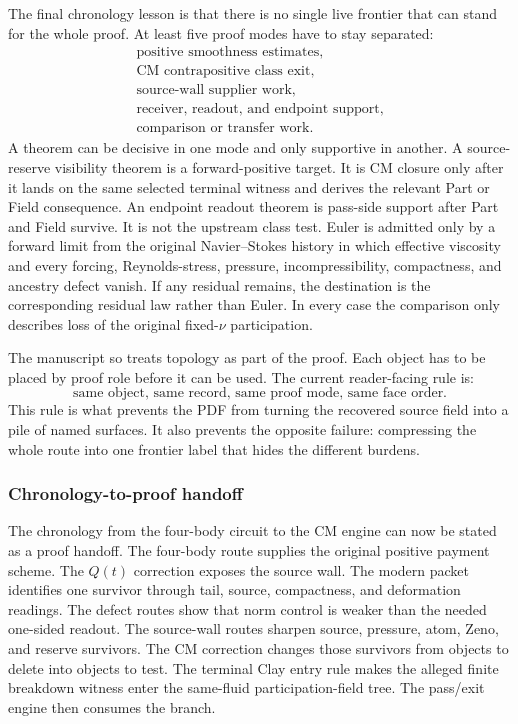 The final chronology lesson is that there is no single live frontier that can
stand for the whole proof.
At least five proof modes have to stay separated:
\[
  \begin{gathered}
  \text{positive smoothness estimates},\\
  \text{CM contrapositive class exit},\\
  \text{source-wall supplier work},\\
  \text{receiver, readout, and endpoint support},\\
  \text{comparison or transfer work.}
  \end{gathered}
\]
A theorem can be decisive in one mode and only supportive in another.
A source-reserve visibility theorem is a forward-positive target.
It is CM closure only after it lands on the same selected terminal witness and
derives the relevant Part or Field consequence.
An endpoint readout theorem is pass-side support after Part and Field
survive.
It is not the upstream class test.
Euler is admitted only by a forward limit from the original Navier--Stokes
history in which effective viscosity and every forcing, Reynolds-stress,
pressure, incompressibility, compactness, and ancestry defect vanish.  If any
residual remains, the destination is the corresponding residual law rather
than Euler.  In every case the comparison only describes loss of the original
fixed-\(\nu\) participation.

The manuscript so treats topology as part of the proof.
Each object has to be placed by proof role before it can be used.
The current reader-facing rule is:
\[
  \text{same object, same record, same proof mode, same face order.}
\]
This rule is what prevents the PDF from turning the recovered source field into
a pile of named surfaces.
It also prevents the opposite failure: compressing the whole route into one
frontier label that hides the different burdens.

\subsubsection{Chronology-to-proof handoff}

The chronology from the four-body circuit to the CM engine can now be stated as
a proof handoff.
The four-body route supplies the original positive payment scheme.
The \(Q(t)\) correction exposes the source wall.
The modern packet identifies one survivor through tail, source, compactness,
and deformation readings.
The defect routes show that norm control is weaker than the needed one-sided
readout.
The source-wall routes sharpen source, pressure, atom, Zeno, and reserve
survivors.
The CM correction changes those survivors from objects to delete into objects
to test.
The terminal Clay entry rule makes the alleged finite breakdown witness enter
the same-fluid participation-field tree.
The pass/exit engine then consumes the branch.

